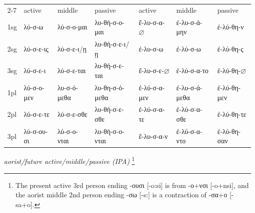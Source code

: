 \documentclass[]{ling-200b-2}
\begin{document}
\scriptsize
\noindent \hfill \par
\begin{tabularx}{0.9\textwidth}{
l
| >{\centering\arraybackslash}X
 >{\centering\arraybackslash}X
 >{\centering\arraybackslash}X
| >{\centering\arraybackslash}X 
 >{\centering\arraybackslash}X
 >{\centering\arraybackslash}X
}
& \multicolumn{3}{c|}{future} & \multicolumn{3}{c}{aorist} \\
\cline{2-7}
& active & middle & passive & active & middle &  passive \\
\hline
1sg & λύ-σ-\color{red}ω & λύ-σ-ο-\color{red}μαι & λυ-θή-σ-ο-\color{red}μαι & ἔ-λυ-σ-α-\color{red}$\varnothing$ & ἐ-λυ-σ-ά-\color{red}μην & ἐ-λύ-θη-\color{red}ν \\
2sg & λύ-σ-ε-\color{red}ις & λύ-σ-ε-\color{red}ι/ῃ & λυ-θή-σ-ε-\color{red}ι/ῃ & ἐ-λυ-σ-\color{red}ω & ἐ-λύ-σ-\color{red}ω & ἐ-λύ-θη-\color{red}ς \\
3sg & λύ-σ-ε-\color{red}ι & λύ-σ-ε-\color{red}ται & λυ-θή-σ-ε-\color{red}ται & ἔ-λυ-σ-ε-\color{red}$\varnothing$ & ἐ-λύ-σ-α-\color{red}το & ἐ-λύ-θη-\color{red}$\varnothing$ \\
1pl & λύ-σ-ο-\color{red}μεν & λυ-σ-ό-\color{red}μεθα & λυ-θη-σ-ό-\color{red}μεθα & ἐ-λύ-σ-α-\color{red}μεν & ἐ-λυ-σ-ά-\color{red}μεθα & ἐ-λύ-θη-\color{red}μεν \\
2pl & λύ-σ-ε-\color{red}τε & λύ-σ-ε-\color{red}σθε & λυ-θή-σ-ε-\color{red}σθε & ἐ-λύ-σ-α-\color{red}τε & ἐ-λύ-σ-α-\color{red}σθε & ἐ-λύ-θη-\color{red}τε \\
3pl & λύ-σ-ου-\color{red}σι & λύ-σ-ο-\color{red}νται & λυ-θή-σ-ο-\color{red}νται & ἔ-λυ-σ-α-\color{red}ν & ἐ-λύ-σ-α-\color{red}ντο & ἐ-λύ-θη-\color{red}σαν \\
\end{tabularx}

\noindent \hfill \par
\noindent \hfill \par
\normalsize
\ex \textit{aorist/future active/middle/passive (IPA) }\footnote{ The present active 3rd person ending -ουσι [-o:si] is from -ο+νσι [-o+nsi], and the aorist middle 2nd person ending -σω [-s:] is a contraction of -σα+ο [-sa+o].}  
\xe
\end{document}
